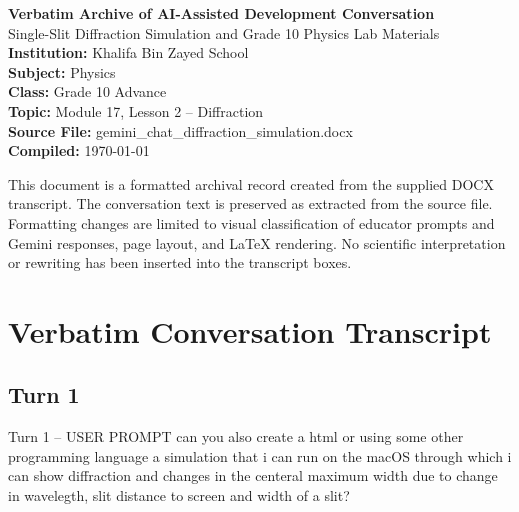 \documentclass[10pt,a4paper]{article}
\begin{document}
\begin{center}
{\Large \textbf{Verbatim Archive of AI-Assisted Development Conversation}}\\[2mm]
{\large Single-Slit Diffraction Simulation and Grade 10 Physics Lab Materials}\\[4mm]
\textbf{Institution:} Khalifa Bin Zayed School\\
\textbf{Subject:} Physics\\
\textbf{Class:} Grade 10 Advance\\
\textbf{Topic:} Module 17, Lesson 2 -- Diffraction\\
\textbf{Source File:} gemini\_chat\_diffraction\_simulation.docx\\
\textbf{Compiled:} \today
\end{center}

\vspace{3mm}
\begin{tcolorbox}[colback=NoteGray,colframe=black!12,colbacktitle=NoteGray,coltitle=black!65,title=Document Integrity Note,fonttitle=\sffamily\bfseries\footnotesize,boxrule=0.3pt,arc=1mm]
This document is a formatted archival record created from the supplied DOCX transcript. The conversation text is preserved as extracted from the source file. Formatting changes are limited to visual classification of educator prompts and Gemini responses, page layout, and LaTeX rendering. No scientific interpretation or rewriting has been inserted into the transcript boxes.
\end{tcolorbox}

\tableofcontents
\newpage

\section{Verbatim Conversation Transcript}

\subsection*{Turn 1}
\begin{userbox}{Turn 1 -- USER PROMPT}
can you also create a html or using some other programming language a simulation that i can run on the macOS through which i can show diffraction and changes in the centeral maximum width due to change in wavelegth, slit distance to screen and width of a slit?
\end{userbox}
\end{document}
